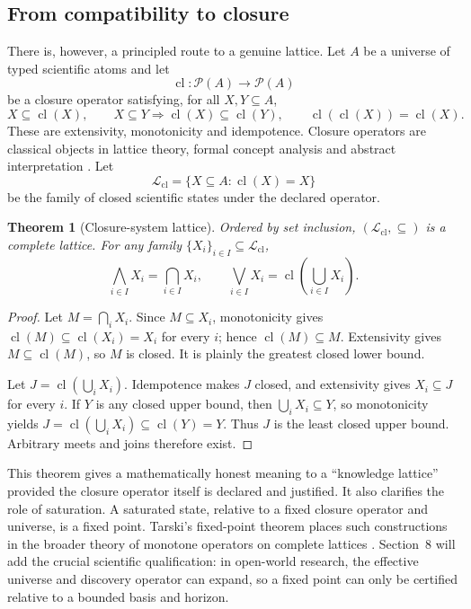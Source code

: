 \documentclass[11pt]{article}
\newcommand{\powerset}{\mathcal P}
\newcommand{\cl}{\operatorname{cl}}
\newtheorem{theorem}{Theorem}
\begin{document}
\subsection{From compatibility to closure}

There is, however, a principled route to a genuine lattice. Let \(A\) be a universe of typed scientific atoms and let
\[
\cl:\powerset(A)\longrightarrow\powerset(A)
\]
be a closure operator satisfying, for all \(X,Y\subseteq A\),
\[
X\subseteq\cl(X),\qquad
X\subseteq Y\Rightarrow\cl(X)\subseteq\cl(Y),\qquad
\cl(\cl(X))=\cl(X).
\]
These are extensivity, monotonicity and idempotence. Closure operators are classical objects in lattice theory, formal concept analysis and abstract interpretation \cite{birkhoff1940,ganter1999,cousot1977}. Let
\[
\mathcal L_{\cl}=\{X\subseteq A:\cl(X)=X\}
\]
be the family of closed scientific states under the declared operator.

\begin{theorem}[Closure-system lattice]
Ordered by set inclusion, \((\mathcal L_{\cl},\subseteq)\) is a complete lattice. For any family \(\{X_i\}_{i\in I}\subseteq\mathcal L_{\cl}\),
\[
\bigwedge_{i\in I}X_i=\bigcap_{i\in I}X_i,
\qquad
\bigvee_{i\in I}X_i=\cl\!\left(\bigcup_{i\in I}X_i\right).
\]
\end{theorem}

\begin{proof}
Let \(M=\bigcap_i X_i\). Since \(M\subseteq X_i\), monotonicity gives \(\cl(M)\subseteq\cl(X_i)=X_i\) for every \(i\); hence \(\cl(M)\subseteq M\). Extensivity gives \(M\subseteq\cl(M)\), so \(M\) is closed. It is plainly the greatest closed lower bound.

Let \(J=\cl(\bigcup_i X_i)\). Idempotence makes \(J\) closed, and extensivity gives \(X_i\subseteq J\) for every \(i\). If \(Y\) is any closed upper bound, then \(\bigcup_i X_i\subseteq Y\), so monotonicity yields \(J=\cl(\bigcup_i X_i)\subseteq\cl(Y)=Y\). Thus \(J\) is the least closed upper bound. Arbitrary meets and joins therefore exist.
\end{proof}

This theorem gives a mathematically honest meaning to a ``knowledge lattice'' provided the closure operator itself is declared and justified. It also clarifies the role of saturation. A saturated state, relative to a fixed closure operator and universe, is a fixed point. Tarski's fixed-point theorem places such constructions in the broader theory of monotone operators on complete lattices \cite{tarski1955}. Section~8 will add the crucial scientific qualification: in open-world research, the effective universe and discovery operator can expand, so a fixed point can only be certified relative to a bounded basis and horizon.
\end{document}
